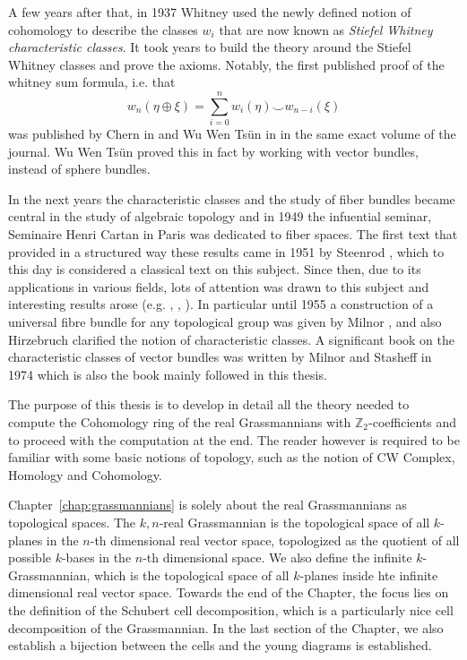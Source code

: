 A few years after that, in 1937 Whitney used \cite{whitneyCohom} the newly defined notion of cohomology to describe the classes $w_i$ that are now known as \emph{Stiefel Whitney characteristic classes}. It took years to build the theory around the Stiefel Whitney classes and prove the axioms. Notably, the first published proof of the whitney sum formula, i.e. that
\[w_n(\eta\oplus\xi)=\sum_{i=0}^nw_i(\eta)\smile w_{n-i}(\xi)\]
was published by Chern in \cite{chern} and Wu Wen Ts\"un in \cite{wu} in the same exact volume of the journal. Wu Wen Ts\"un proved this in fact by working with vector bundles, instead of sphere bundles.

In the next years the characteristic classes and the study of fiber bundles became central in the study of algebraic topology and in 1949 the infuential seminar, Seminaire Henri Cartan in Paris \cite{cartan1955seminaire} was dedicated to fiber spaces. The first text that provided in a structured way these results came in 1951 by Steenrod \cite{steenrod1951topology}, which to this day is considered a classical text on this subject.  Since then, due to its applications in various fields, lots of attention was drawn to this subject and interesting results arose (e.g. \cite{thom1952espaces}, \cite{borel1955topology}, \cite{hirzebruch1956}). In particular until 1955 a construction of a universal fibre bundle for any topological group was given by Milnor \cite{milnor1956construction} \cite{milnor1956construction2}, and also Hirzebruch clarified the notion of characteristic classes. A significant book on the characteristic classes of vector bundles was written by Milnor and Stasheff in 1974 \cite{char_class} which is also the book mainly followed in this thesis.

The purpose of this thesis is to develop in detail all the theory needed to compute the Cohomology ring of the real Grassmannians with $\mathbb{Z}_2$-coefficients and to proceed with the computation at the end. The reader however is required to be familiar with some basic notions of topology, such as the notion of CW Complex, Homology and Cohomology.

Chapter~\ref{chap:grassmannians} is solely about the real Grassmannians as topological spaces. The $k,n$-real Grassmannian is the topological space of all $k$-planes in the $n$-th dimensional real vector space, topologized as the quotient of all possible $k$-bases in the $n$-th dimensional space. We also define the infinite $k$-Grassmannian, which is the topological space of all $k$-planes inside hte infinite dimensional real vector space. Towards the end of the Chapter, the focus lies on the definition of the Schubert cell decomposition, which is a particularly nice cell decomposition of the Grassmannian. In the last section of the Chapter, we also establish a bijection between the cells and the young diagrams is established.

